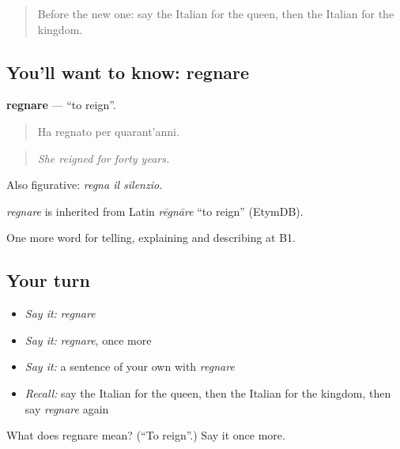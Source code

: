 \label{lesson:IT-C325-regnare}



\begin{quote}
Before the new one: say the Italian for the queen, then the Italian for the kingdom.
\end{quote}

\subsection*{You'll want to know: regnare}
\textbf{regnare} — \textquotedblleft{}to reign\textquotedblright{}.

\begin{quote}
Ha regnato per quarant'anni.
\end{quote}

\begin{quote}
\emph{She reigned for forty years.}
\end{quote}

Also figurative: \emph{regna il silenzio}.

\begin{cousinweb}
\emph{regnare} is inherited from Latin \emph{rēgnāre} \textquotedblleft{}to reign\textquotedblright{} (EtymDB).
\end{cousinweb}

\begin{grammarlens}[title={What you've built}]
One more word for telling, explaining and describing at B1.
\end{grammarlens}

\subsection*{Your turn}
\begin{itemize}
\raggedright
  \item \emph{Say it:} \emph{regnare}
  \item \emph{Say it:} \emph{regnare}, once more
  \item \emph{Say it:} a sentence of your own with \emph{regnare}
  \item \emph{Recall:} say the Italian for the queen, then the Italian for the kingdom, then say \emph{regnare} again
\end{itemize}

\begin{tcolorbox}[breakable,colback=teal!4,colframe=teal!35!black,title={Before you move on}]
What does regnare mean? (\textquotedblleft{}To reign\textquotedblright{}.) Say it once more.
\end{tcolorbox}
